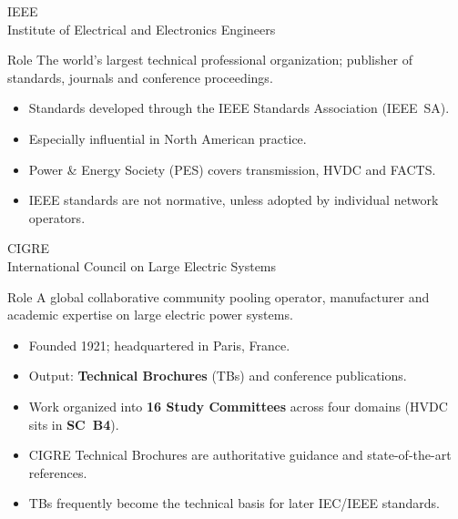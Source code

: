 \begin{frame}{IEEE\\Institute of Electrical and Electronics Engineers}
  \begin{block}{Role}
    The world's largest technical professional organization; publisher of
    standards, journals and conference proceedings.
  \end{block}
  \vspace{0.3em}
  \begin{itemize}
    \setlength{\itemsep}{0.4em}
    \item Standards developed through the IEEE Standards Association (IEEE~SA).
    \item Especially influential in North American practice.
    \item Power \& Energy Society (PES) covers transmission, HVDC and FACTS.
    \item IEEE standards are not normative, unless adopted by individual network operators.
  \end{itemize}
\end{frame}


\begin{frame}{CIGRE\\International Council on Large Electric Systems}
  \begin{block}{Role}
    A global collaborative community pooling operator, manufacturer and
    academic expertise on large electric power systems.
  \end{block}
  \vspace{0.3em}
  \begin{itemize}
    \setlength{\itemsep}{0.4em}
    \item Founded 1921; headquartered in Paris, France.
    \item Output: \textbf{Technical Brochures} (TBs) and conference publications.
    \item Work organized into \textbf{16 Study Committees} across four domains (HVDC sits in \textbf{SC~B4}).
    \item CIGRE Technical Brochures are authoritative guidance and state-of-the-art references.
    \item TBs frequently become the technical basis for later IEC/IEEE standards.
  \end{itemize}
\end{frame}


